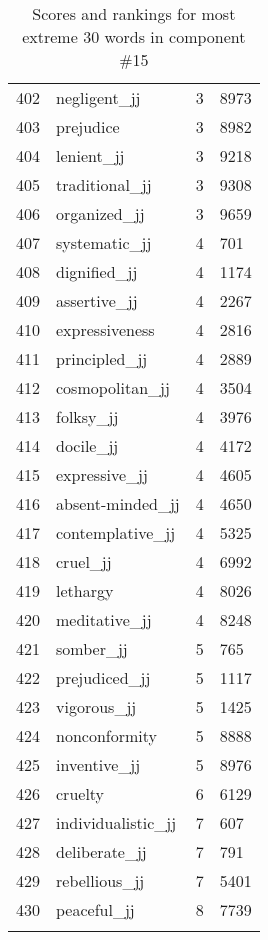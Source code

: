\begin{longtable}[!htbp]{| rlr@{.}l |}
    402 & negligent\_jj & 3 & 8973 \\
    403 & prejudice & 3 & 8982 \\
    404 & lenient\_jj & 3 & 9218 \\
    405 & traditional\_jj & 3 & 9308 \\
    406 & organized\_jj & 3 & 9659 \\
    407 & systematic\_jj & 4 & 701 \\
    408 & dignified\_jj & 4 & 1174 \\
    409 & assertive\_jj & 4 & 2267 \\
    410 & expressiveness & 4 & 2816 \\
    411 & principled\_jj & 4 & 2889 \\
    412 & cosmopolitan\_jj & 4 & 3504 \\
    413 & folksy\_jj & 4 & 3976 \\
    414 & docile\_jj & 4 & 4172 \\
    415 & expressive\_jj & 4 & 4605 \\
    416 & absent-minded\_jj & 4 & 4650 \\
    417 & contemplative\_jj & 4 & 5325 \\
    418 & cruel\_jj & 4 & 6992 \\
    419 & lethargy & 4 & 8026 \\
    420 & meditative\_jj & 4 & 8248 \\
    421 & somber\_jj & 5 & 765 \\
    422 & prejudiced\_jj & 5 & 1117 \\
    423 & vigorous\_jj & 5 & 1425 \\
    424 & nonconformity & 5 & 8888 \\
    425 & inventive\_jj & 5 & 8976 \\
    426 & cruelty & 6 & 6129 \\
    427 & individualistic\_jj & 7 & 607 \\
    428 & deliberate\_jj & 7 & 791 \\
    429 & rebellious\_jj & 7 & 5401 \\
    430 & peaceful\_jj & 8 & 7739 \\
    \hline
    \caption{Scores and rankings for most extreme 30 words in component \#15} \\
\end{longtable}
